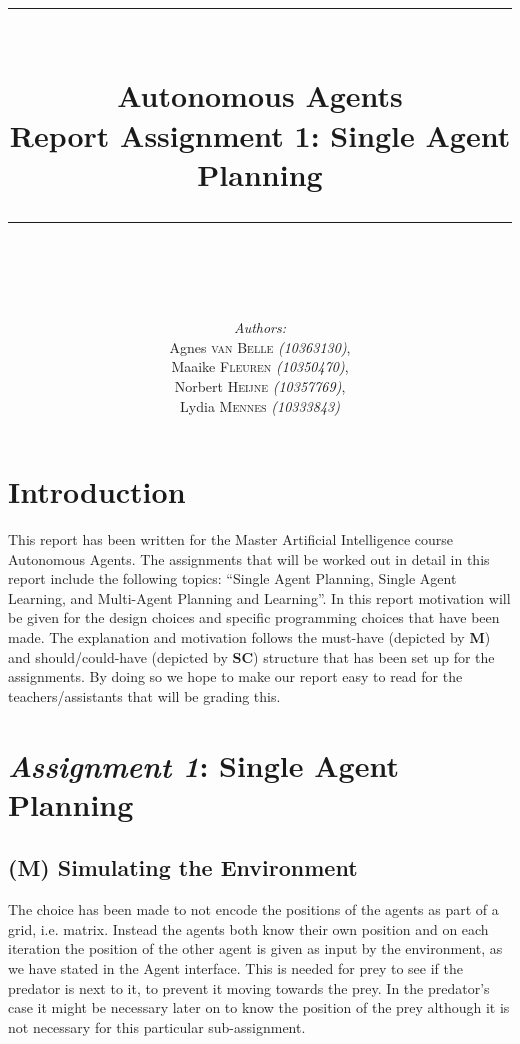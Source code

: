 \documentclass{article}
\newcommand{\HRule}{\rule{\linewidth}{0.1mm}}
\begin{document}
\title{ \HRule \\[0.2cm]
		Autonomous Agents\\ 
		Report Assignment 1: Single Agent Planning\\
		\HRule \\[0.1cm]
		}
		
\author{
		\emph{Authors:}\\[0.2cm]
		Agnes \textsc{van Belle} \small{ \emph{(10363130)}},\\ 
		Maaike \textsc{Fleuren} \small{ \emph{(10350470)}}, \\
		Norbert \textsc{Heijne} \small{ \emph{(10357769)}}, \\
		Lydia \textsc{Mennes} \small{ \emph{(10333843)}}
		}

 
\maketitle

\section{Introduction}
This report has been written for the Master Artificial Intelligence course Autonomous Agents. The assignments that will be worked out in detail in this report include the following topics: ``Single Agent Planning, Single Agent Learning, and Multi-Agent Planning and Learning''. In this report motivation will be given for the design choices and specific programming choices that have been made. The explanation and motivation follows the must-have (depicted by \textbf{M}) and should/could-have (depicted by \textbf{SC}) structure that has been set up for the assignments. By doing so we hope to make our report easy to read for the teachers/assistants that will be grading this.

\section{\emph{Assignment 1}: Single Agent Planning}

\subsection{(M) Simulating the Environment}
The choice has been made to not encode the positions of the agents as part of a grid, i.e. matrix. Instead the agents both know their own position and on each iteration the position of the other agent is given as input by the environment, as we have stated in the Agent interface. This is needed for prey to see if the predator is next to it, to prevent it moving towards the prey. In the predator's case it might be necessary later on to know the position of the prey although it is not necessary for this particular sub-assignment.
\end{document}
